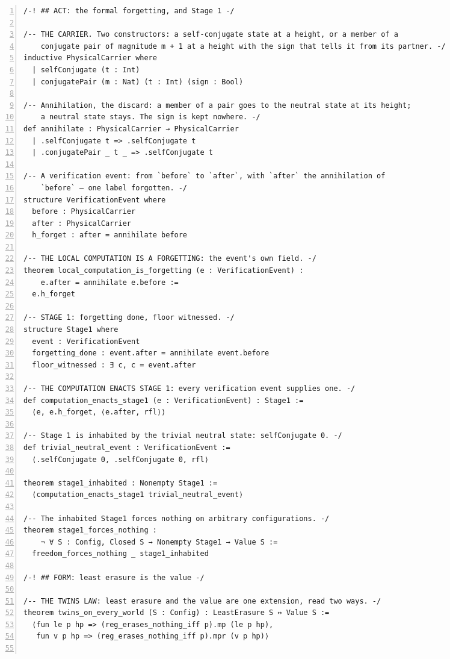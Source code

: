 \documentclass[10pt]{article}
\newcommand{\leansize}{\fontsize{5.5pt}{6.75pt}\selectfont}
\begin{document}
\begin{multicols}{2}
\begin{Verbatim}[numbers=left,firstnumber=1,numbersep=3pt,xleftmargin=2.6em,breaklines=true,breakanywhere=true,breakautoindent=false,breakindent=1.4em,breaksymbolleft={},breakanywheresymbolpre={},fontsize=\leansize]
/-! ## ACT: the formal forgetting, and Stage 1 -/

/-- THE CARRIER. Two constructors: a self-conjugate state at a height, or a member of a
    conjugate pair of magnitude m + 1 at a height with the sign that tells it from its partner. -/
inductive PhysicalCarrier where
  | selfConjugate (t : Int)
  | conjugatePair (m : Nat) (t : Int) (sign : Bool)

/-- Annihilation, the discard: a member of a pair goes to the neutral state at its height;
    a neutral state stays. The sign is kept nowhere. -/
def annihilate : PhysicalCarrier → PhysicalCarrier
  | .selfConjugate t => .selfConjugate t
  | .conjugatePair _ t _ => .selfConjugate t

/-- A verification event: from `before` to `after`, with `after` the annihilation of
    `before` — one label forgotten. -/
structure VerificationEvent where
  before : PhysicalCarrier
  after : PhysicalCarrier
  h_forget : after = annihilate before

/-- THE LOCAL COMPUTATION IS A FORGETTING: the event's own field. -/
theorem local_computation_is_forgetting (e : VerificationEvent) :
    e.after = annihilate e.before :=
  e.h_forget

/-- STAGE 1: forgetting done, floor witnessed. -/
structure Stage1 where
  event : VerificationEvent
  forgetting_done : event.after = annihilate event.before
  floor_witnessed : ∃ c, c = event.after

/-- THE COMPUTATION ENACTS STAGE 1: every verification event supplies one. -/
def computation_enacts_stage1 (e : VerificationEvent) : Stage1 :=
  ⟨e, e.h_forget, ⟨e.after, rfl⟩⟩

/-- Stage 1 is inhabited by the trivial neutral state: selfConjugate 0. -/
def trivial_neutral_event : VerificationEvent :=
  ⟨.selfConjugate 0, .selfConjugate 0, rfl⟩

theorem stage1_inhabited : Nonempty Stage1 :=
  ⟨computation_enacts_stage1 trivial_neutral_event⟩

/-- The inhabited Stage1 forces nothing on arbitrary configurations. -/
theorem stage1_forces_nothing :
    ¬ ∀ S : Config, Closed S → Nonempty Stage1 → Value S :=
  freedom_forces_nothing _ stage1_inhabited

/-! ## FORM: least erasure is the value -/

/-- THE TWINS LAW: least erasure and the value are one extension, read two ways. -/
theorem twins_on_every_world (S : Config) : LeastErasure S ↔ Value S :=
  ⟨fun le p hp => (reg_erases_nothing_iff p).mp (le p hp),
   fun v p hp => (reg_erases_nothing_iff p).mpr (v p hp)⟩


\end{Verbatim}
\end{multicols}
\end{document}
